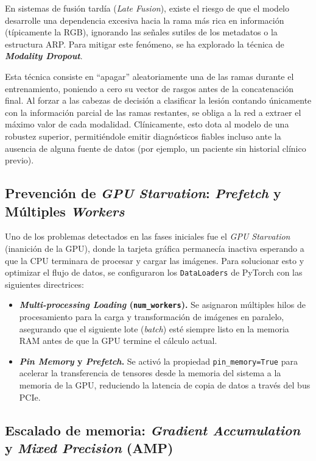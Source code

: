 En sistemas de fusión tardía (\textit{Late Fusion}), existe el riesgo de que el modelo desarrolle una dependencia excesiva hacia la rama más rica en información (típicamente la RGB), ignorando las señales sutiles de los metadatos o la estructura ARP. Para mitigar este fenómeno, se ha explorado la técnica de \textbf{\textit{Modality Dropout}}.

Esta técnica consiste en ``apagar'' aleatoriamente una de las ramas durante el entrenamiento, poniendo a cero su vector de rasgos antes de la concatenación final. Al forzar a las cabezas de decisión a clasificar la lesión contando únicamente con la información parcial de las ramas restantes, se obliga a la red a extraer el máximo valor de cada modalidad. Clínicamente, esto dota al modelo de una robustez superior, permitiéndole emitir diagnósticos fiables incluso ante la ausencia de alguna fuente de datos (por ejemplo, un paciente sin historial clínico previo).

\subsection{Prevención de \textit{GPU Starvation}: \textit{Prefetch} y Múltiples \textit{Workers}}

Uno de los problemas detectados en las fases iniciales fue el \textit{GPU Starvation} (inanición de la GPU), donde la tarjeta gráfica permanecía inactiva esperando a que la CPU terminara de procesar y cargar las imágenes. Para solucionar esto y optimizar el flujo de datos, se configuraron los \texttt{DataLoaders} de PyTorch con las siguientes directrices:

\begin{itemize}
	\item \textbf{\textit{Multi-processing Loading} (\texttt{num\_workers}).} Se asignaron múltiples hilos de procesamiento para la carga y transformación de imágenes en paralelo, asegurando que el siguiente lote (\textit{batch}) esté siempre listo en la memoria RAM antes de que la GPU termine el cálculo actual.
	
	\item \textbf{\textit{Pin Memory} y \textit{Prefetch}.} Se activó la propiedad \texttt{pin\_memory=True} para acelerar la transferencia de tensores desde la memoria del sistema a la memoria de la GPU, reduciendo la latencia de copia de datos a través del bus PCIe.
\end{itemize}

\subsection{Escalado de memoria: \textit{Gradient Accumulation} y \textit{Mixed Precision} (AMP)}

